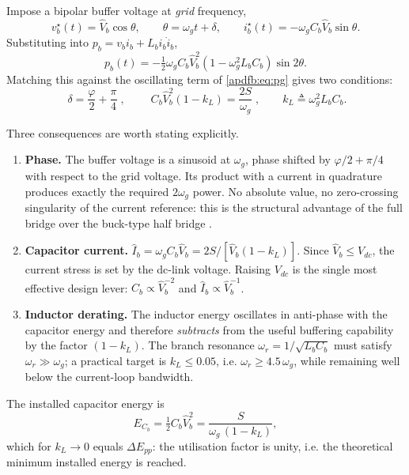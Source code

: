 Impose a bipolar buffer voltage at \emph{grid} frequency,
\begin{equation}
v_b^\star(t) = \hat V_b\cos\theta, \qquad \theta = \omega_g t + \delta ,
\qquad i_b^\star(t) = -\omega_g C_b \hat V_b \sin\theta .
\label{apdfb:eq:refs}
\end{equation}
Substituting into $p_b = v_b i_b + L_b i_b \dot i_b$,
\begin{equation}
p_b(t) = -\tfrac12 \omega_g C_b \hat V_b^2 \left(1-\omega_g^2 L_b C_b\right)\sin 2\theta .
\end{equation}
Matching this against the oscillating term of \eqref{apdfb:eq:pg} gives two conditions:
\begin{equation}
\boxed{\;\delta = \frac{\varphi}{2} + \frac{\pi}{4}\;},
\qquad
\boxed{\;C_b\hat V_b^2\left(1-k_L\right) = \frac{2S}{\omega_g}\;},
\qquad k_L \triangleq \omega_g^2 L_b C_b .
\label{apdfb:eq:design}
\end{equation}

Three consequences are worth stating explicitly.

\begin{enumerate}
\item \textbf{Phase.} The buffer voltage is a sinusoid at $\omega_g$, phase
shifted by $\varphi/2+\pi/4$ with respect to the grid voltage. Its product with
a current in quadrature produces exactly the required $2\omega_g$ power. No
absolute value, no zero-crossing singularity of the current reference: this is
the structural advantage of the full bridge over the buck-type half bridge
\cite{tang2015symmetrical}.

\item \textbf{Capacitor current.} $\hat I_b = \omega_g C_b \hat V_b =
2S/[\hat V_b(1-k_L)]$. Since $\hat V_b \le V_{dc}$, the current stress is set by
the dc-link voltage. Raising $V_{dc}$ is the single most effective design lever:
$C_b\propto\hat V_b^{-2}$ and $\hat I_b\propto\hat V_b^{-1}$.

\item \textbf{Inductor derating.} The inductor energy oscillates in
anti-phase with the capacitor energy and therefore \emph{subtracts} from the
useful buffering capability by the factor $(1-k_L)$. The branch resonance
$\omega_r = 1/\sqrt{L_bC_b}$ must satisfy $\omega_r \gg \omega_g$; a practical
target is $k_L\le 0.05$, i.e. $\omega_r \ge 4.5\,\omega_g$, while remaining well
below the current-loop bandwidth.
\end{enumerate}

The installed capacitor energy is
\begin{equation}
E_{C_b} = \tfrac12 C_b\hat V_b^2 = \frac{S}{\omega_g\,(1-k_L)} ,
\end{equation}
which for $k_L\to 0$ equals $\Delta E_{pp}$: the utilisation factor is unity,
i.e. the theoretical minimum installed energy is reached.

